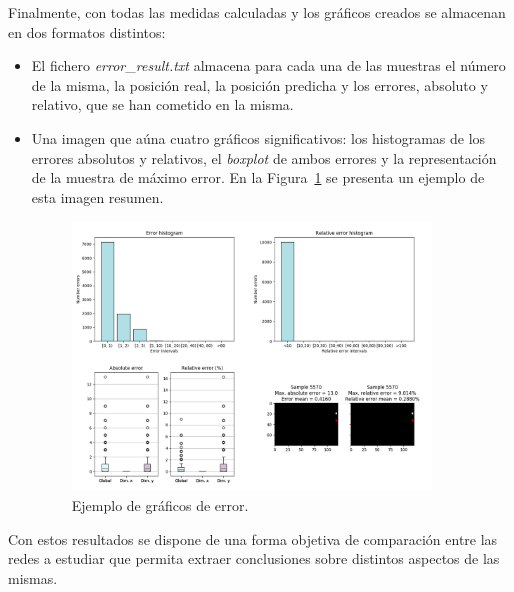 Finalmente, con todas las medidas calculadas y los gráficos creados se almacenan en dos formatos distintos:
\begin{itemize}
    \item El fichero \textit{error}\_\textit{result.txt} almacena para cada una de las muestras el número de la misma, la posición real, la posición predicha y los errores, absoluto y relativo, que se han cometido en la misma.
    \item Una imagen que aúna cuatro gráficos significativos: los histogramas de los errores absolutos y relativos, el \textit{boxplot} de ambos errores y la representación de la muestra de máximo error. En la Figura~\ref{fig.test_example} se presenta un ejemplo de esta imagen resumen.
    \begin{figure}[H]
		\begin{center}
			\includegraphics[width=0.9\textwidth]{Memoria-TFM/figures/error_stats_example.png}
			\caption{Ejemplo de gráficos de error.}
			\label{fig.test_example}
		\end{center}
    \end{figure}
    \vspace{-10pt}
\end{itemize}

Con estos resultados se dispone de una forma objetiva de comparación entre las redes a estudiar que permita extraer conclusiones sobre distintos aspectos de las mismas.